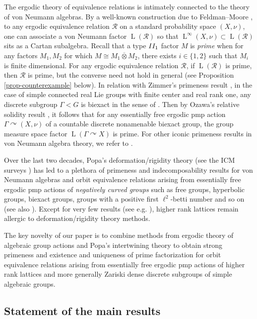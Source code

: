 \documentclass[11pt]{amsart}
\numberwithin{equation}{section}
\theoremstyle{plain}
\theoremstyle{definition}
\newcommand{\ovt}{\mathbin{\overline{\otimes}}}
\newcommand{\rL}{\operatorname{L}}
\begin{document}
The ergodic theory of equivalence relations is intimately connected to the theory of von Neumann algebras. By a well-known construction due to Feldman--Moore \cite{FM75}, to any ergodic equivalence relation $\mathscr R$ on a standard probability space $(X, \nu)$, one can associate a von Neumann factor $\rL(\mathscr R)$ so that $\rL^\infty(X, \nu) \subset \rL(\mathscr R)$ sits as a Cartan subalgebra. Recall that a type ${\rm II_1}$ factor $M$ is {\em prime} when for any factors $M_1, M_2$ for which $M \cong M_1 \ovt M_2$, there exists $i \in \{1, 2\}$ such that $M_i$ is finite dimensional. For any ergodic equivalence relation $\mathscr R$, if $\rL(\mathscr R)$ is prime, then $\mathscr R$ is prime, but the converse need not hold in general (see Proposition \ref{prop-counterexample} below). In relation with Zimmer's primeness result \cite{Zi81}, in the case of simple connected real Lie groups with finite center and real rank one, any discrete subgroup $\Gamma < G$ is biexact in the sense of \cite{BO08}. Then by Ozawa's relative solidity result \cite{Oz04}, it follows that for any essentially free ergodic pmp action $\Gamma \curvearrowright (X, \nu)$ of a countable discrete nonamenable biexact group, the group measure space factor $\rL(\Gamma \curvearrowright X)$ is prime. For other iconic primeness results in von Neumann algebra theory, we refer to \cite{Ge96, Oz03, Pe06}.


Over the last two decades, Popa's deformation/rigidity theory (see the ICM surveys \cite{Po06, Va10, Io18}) has led to a plethora of primeness and indecomposability results for von Neumann algebras and orbit equivalence relations arising from essentially free ergodic pmp actions of {\em negatively curved groups} such as free groups, hyperbolic groups, biexact groups, groups with a positive first $\ell^2$-betti number and so on (see also \cite{Ad92, Ki05}). Except for very few results (see e.g.\! \cite{DHI16, BIP18, IM19}), higher rank lattices remain allergic to deformation/rigidity theory methods.


The key novelty of our paper is to combine methods from ergodic theory of algebraic group actions and Popa's intertwining theory to obtain strong primeness and existence and uniqueness of prime factorization for orbit equivalence relations arising from essentially free ergodic pmp actions of higher rank lattices and more generally Zariski dense discrete subgroups of simple algebraic groups. 




\subsection*{Statement of the main results}
\end{document}
